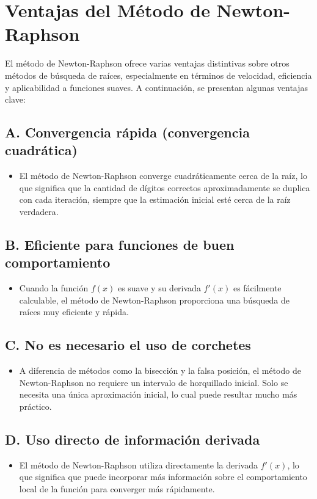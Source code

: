 \documentclass[conference]{IEEEtran}
\begin{document}
\section*{Ventajas del Método de Newton-Raphson}
El método de Newton-Raphson ofrece varias ventajas distintivas sobre otros métodos de búsqueda de raíces, especialmente en términos de velocidad, eficiencia y aplicabilidad a funciones suaves. A continuación, se presentan algunas ventajas clave:

\subsection*{A. Convergencia rápida (convergencia cuadrática)}
\begin{itemize}
    \item  El método de Newton-Raphson converge cuadráticamente cerca de la raíz, lo que significa que la cantidad de dígitos correctos aproximadamente se duplica con cada iteración, siempre que la estimación inicial esté cerca de la raíz verdadera.
\end{itemize}

\subsection*{B. Eficiente para funciones de buen comportamiento}
\begin{itemize}
    \item Cuando la función $f(x)$ es suave y su derivada $f'(x)$ es fácilmente calculable, el método de Newton-Raphson proporciona una búsqueda de raíces muy eficiente y rápida.
\end{itemize}

\subsection*{C. No es necesario el uso de corchetes}
\begin{itemize}
    \item A diferencia de métodos como la bisección y la falsa posición, el método de Newton-Raphson no requiere un intervalo de horquillado inicial. Solo se necesita una única aproximación inicial, lo cual puede resultar mucho más práctico.
\end{itemize}

\subsection*{D. Uso directo de información derivada}
\begin{itemize}
    \item El método de Newton-Raphson utiliza directamente la derivada $f'(x)$, lo que significa que puede incorporar más información sobre el comportamiento local de la función para converger más rápidamente.
\end{itemize}
\end{document}
